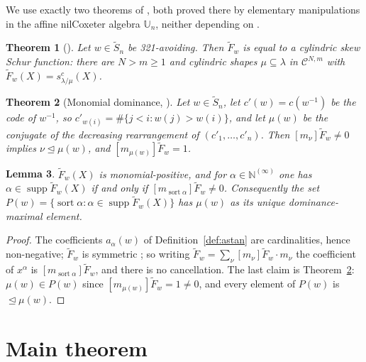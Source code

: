 \documentclass[11pt]{article}
\theoremstyle{plain}
\newtheorem{thm}{Theorem}[section]
\newtheorem{lem}[thm]{Lemma}
\theoremstyle{definition}
\DeclareMathOperator{\supp}{supp}
\DeclareMathOperator{\sort}{sort}
\newcommand{\N}{\mathbb{N}}
\newcommand{\Saff}{\widetilde{S}_{n}}
\newcommand{\Fw}{\widetilde{F}_{w}}
\newcommand{\cyl}{\mathcal{C}}
\begin{document}
We use exactly two theorems of \cite{Lam2006}, both proved there by elementary manipulations
in the affine nilCoxeter algebra $\mathbb U_n$, neither depending on \cite{Lam2008}.

\begin{thm}[{\cite[\texttt{thm:321}, l.1844--47]{Lam2006}}]\label{thm:lam321}
Let $w\in\Saff$ be 321-avoiding. Then $\Fw$ is equal to a cylindric skew Schur function: there
are $N>m\ge1$ and cylindric shapes $\mu\subseteq\lambda$ in $\cyl^{N,m}$ with
$\Fw(X)=s^{c}_{\lambda/\mu}(X)$.
\end{thm}

\begin{thm}[Monomial dominance, {\cite[\texttt{thm:monomial}, l.945]{Lam2006}}]\label{thm:lammon}
Let $w\in\Saff$, let $c'(w)=c(w^{-1})$ be the code of $w^{-1}$, so
$c'_{w(i)}=\#\{j<i:w(j)>w(i)\}$, and let $\mu(w)$ be the conjugate of the decreasing
rearrangement of $(c'_1,\dots,c'_n)$. Then $[m_\nu]\Fw\ne0$ implies $\nu\trianglelefteq\mu(w)$,
and $[m_{\mu(w)}]\Fw=1$.
\end{thm}

\begin{lem}\label{lem:monpos}
$\Fw(X)$ is monomial-positive, and for $\alpha\in\N^{(\infty)}$ one has $\alpha\in\supp\Fw(X)$
if and only if $[m_{\sort\alpha}]\Fw\ne0$. Consequently the set
$P(w)=\{\sort\alpha:\alpha\in\supp\Fw(X)\}$ has $\mu(w)$ as its unique
dominance-maximal element.
\end{lem}
\begin{proof}
The coefficients $a_\alpha(w)$ of Definition~\ref{def:astan} are cardinalities, hence
non-negative; $\Fw$ is symmetric \cite[\texttt{thm:sym}, l.626]{Lam2006}; so writing
$\Fw=\sum_\nu[m_\nu]\Fw\cdot m_\nu$ the coefficient of $x^\alpha$ is $[m_{\sort\alpha}]\Fw$, and
there is no cancellation. The last claim is Theorem~\ref{thm:lammon}: $\mu(w)\in P(w)$ since
$[m_{\mu(w)}]\Fw=1\ne0$, and every element of $P(w)$ is $\trianglelefteq\mu(w)$.
\end{proof}

\section{Main theorem}\label{sec:main}
\end{document}

